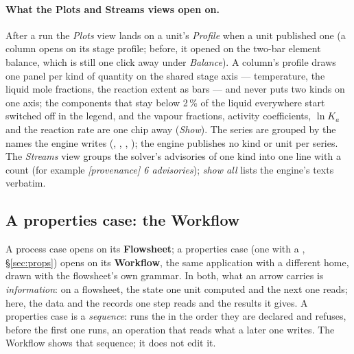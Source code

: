 \documentclass[11pt,a4paper]{article}
\begin{document}
\paragraph{What the Plots and Streams views open on.}  After a run the
\emph{Plots} view lands on a unit's \emph{Profile} when a unit published one
(a column opens on its stage profile; before, it opened on the two-bar element
balance, which is still one click away under \emph{Balance}).  A column's
profile draws one panel per kind of quantity on the shared stage axis ---
temperature, the liquid mole fractions, the reaction extent as bars --- and
never puts two kinds on one axis; the components that stay below 2\,\% of the
liquid everywhere start switched off in the legend, and the vapour fractions,
activity coefficients, $\ln K_a$ and the reaction rate are one chip away
(\emph{Show}).  The series are grouped by the names the engine writes
(, , , ); the engine
publishes no kind or unit per series.  The \emph{Streams} view groups the
solver's advisories of one kind into one line with a count (for example
\emph{[provenance] 6 advisories}); \emph{show all} lists the engine's texts
verbatim.

\subsection{A properties case: the Workflow}\label{sec:gui-workflow}

A process case opens on its \textbf{Flowsheet}; a properties case (one
with a , \S\ref{sec:props}) opens on its
\textbf{Workflow}, the same application with a different home, drawn
with the flowsheet's own grammar.  In both, what an arrow carries is
\emph{information}: on a flowsheet, the state one unit computed and the
next one reads; here, the data and the records one step reads and the
results it gives.  A properties case is a \emph{sequence}:
 runs the  in the order they are
declared and refuses, before the first one runs, an operation that reads
what a later one writes.  The Workflow shows that sequence; it does not
edit it.
\end{document}

